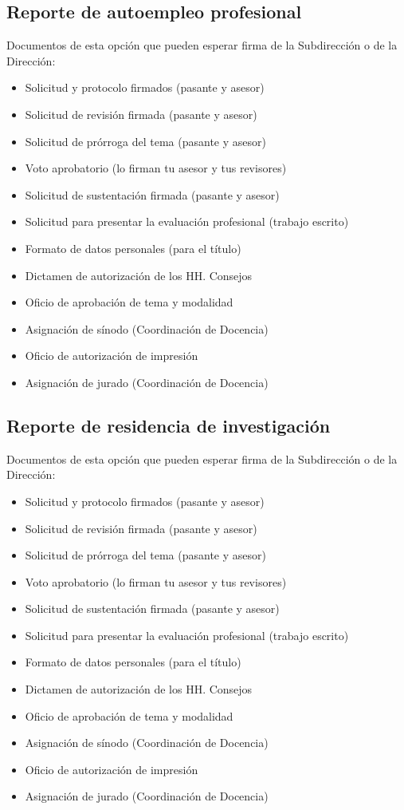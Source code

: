 \subsection{Reporte de autoempleo profesional}
Documentos de esta opción que pueden esperar firma de la Subdirección o de la Dirección:
\begin{itemize}
  \item Solicitud y protocolo firmados (pasante y asesor)
  \item Solicitud de revisión firmada (pasante y asesor)
  \item Solicitud de prórroga del tema (pasante y asesor)
  \item Voto aprobatorio (lo firman tu asesor y tus revisores)
  \item Solicitud de sustentación firmada (pasante y asesor)
  \item Solicitud para presentar la evaluación profesional (trabajo escrito)
  \item Formato de datos personales (para el título)
  \item Dictamen de autorización de los HH. Consejos
  \item Oficio de aprobación de tema y modalidad
  \item Asignación de sínodo (Coordinación de Docencia)
  \item Oficio de autorización de impresión
  \item Asignación de jurado (Coordinación de Docencia)
\end{itemize}
\subsection{Reporte de residencia de investigación}
Documentos de esta opción que pueden esperar firma de la Subdirección o de la Dirección:
\begin{itemize}
  \item Solicitud y protocolo firmados (pasante y asesor)
  \item Solicitud de revisión firmada (pasante y asesor)
  \item Solicitud de prórroga del tema (pasante y asesor)
  \item Voto aprobatorio (lo firman tu asesor y tus revisores)
  \item Solicitud de sustentación firmada (pasante y asesor)
  \item Solicitud para presentar la evaluación profesional (trabajo escrito)
  \item Formato de datos personales (para el título)
  \item Dictamen de autorización de los HH. Consejos
  \item Oficio de aprobación de tema y modalidad
  \item Asignación de sínodo (Coordinación de Docencia)
  \item Oficio de autorización de impresión
  \item Asignación de jurado (Coordinación de Docencia)
\end{itemize}
